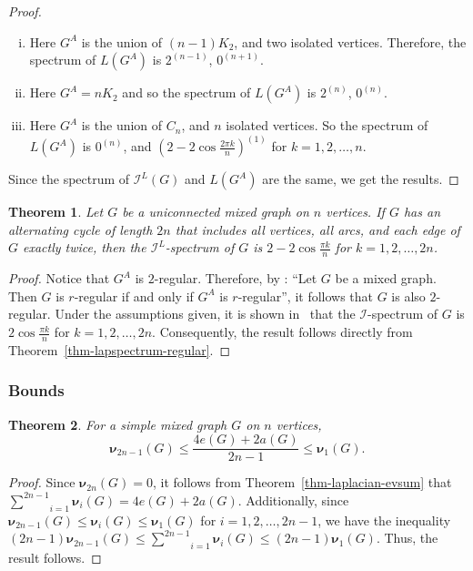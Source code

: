 \documentclass[12pt]{article}
\numberwithin{equation}{section}
\newtheorem{thm}{Theorem}[section]
\begin{document}
	\begin{proof}
		\begin{enumerate}[(i)]
			\item Here $G^A$ is the union of $(n-1)K_2$, and two isolated vertices. Therefore, the spectrum of $L(G^A)$ is $2^{(n-1)}$, $0^{(n+1)}$.
			\item Here $G^A=nK_2$ and so the spectrum of $L(G^A)$ is $2^{(n)}$, $0^{(n)}$. 
			\item Here $G^A$ is the union of $C_n$, and $n$ isolated vertices. So the spectrum of $L(G^A)$ is $0^{(n)}$, and $(2-2\cos\frac{2\pi k}{n})^{(1)}$ for $k=1,2,\ldots,n$. 
		\end{enumerate}
		Since the spectrum of $\mathcal{I}^L(G)$ and $L(G^A)$ are the same, we get the results.
	\end{proof}
	\begin{thm}\label{Laplacian spectrum cycle}
		Let $G$ be a uniconnected mixed graph on $n$ vertices. If $G$ has an alternating cycle of length $2n$ that includes all vertices, all arcs, and each edge of $G$ exactly twice, then the $\mathcal{I}^L$-spectrum of $G$ is $2-2\cos\frac{\pi k}{n}$ for $k=1,2,\ldots,2n$.
	\end{thm}
	\begin{proof} 
		Notice that $G^A$ is $2$-regular. Therefore, by \cite[Lemma~6.1]{Kalaimatrices1}: ``Let $G$ be a mixed graph. Then $G$ is $r$-regular if and only if $G^A$ is $r$-regular'', it follows that $G$ is also $2$-regular.
		Under the assumptions given, it is shown in~\cite[Theorem~6.3(iii)]{Kalaimatrices1} that the $\mathcal{I}$-spectrum of $G$ is $2\cos\frac{\pi k}{n}$ for $k=1,2,\ldots,2n$. Consequently, the result follows directly from Theorem~\ref{thm-lapspectrum-regular}.		
	\end{proof}
	\subsubsection{Bounds}
	\begin{thm}
		For a simple mixed graph $G$ on $n$ vertices,
		$$\bm{\nu}_{2n-1}(G)\leq\frac{4e(G)+2a(G)}{2n-1}\leq\bm{\nu}_{1}(G).$$
	\end{thm}
	\begin{proof}
		Since $\bm{\nu}_{2n}(G)=0$, it follows from Theorem~\ref{thm-laplacian-evsum} that $\underset{i=1}{\overset{2n-1}{\sum}}\bm{\nu}_i(G)=4e(G)+2a(G)$. Additionally, since $\bm{\nu}_{2n-1}(G)\leq\bm{\nu}_i(G)\leq\bm{\nu}_1(G)$ for $i=1,2,\ldots,2n-1$, we have the inequality $(2n-1)\bm{\nu}_{2n-1}(G)\leq\underset{i=1}{\overset{2n-1}{\sum}}\bm{\nu}_i(G)\leq(2n-1)\bm{\nu}_1(G)$. Thus, the result follows.
	\end{proof}
	
\end{document}
